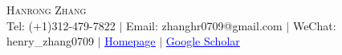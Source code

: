 \documentclass[letterpaper,11pt]{article}
\begin{document}

\begin{center}
    {\Huge \scshape Hanrong Zhang} \\ \vspace{1pt}
    \small Tel: (+1)312-479-7822 $|$
    \small  {Email: zhanghr0709@gmail.com}
    $|$ \small {WeChat: henry\_zhang0709}
    $|$ \small  \href{https://zhang-henry.github.io}{\textcolor{blue}{\underline{Homepage}}}
    $|$ \small \href{https://scholar.google.com/citations?user=qG5_O40AAAAJ&hl=zh-CN}{\textcolor{blue}{\underline{Google Scholar}}}

\end{center}



\end{document}
